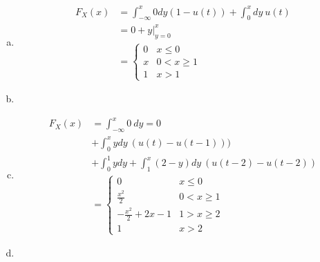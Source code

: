 \documentclass[12pt]{article}
\newenvironment{problem}[2][Problem]{\begin{trivlist}
\item[\hskip \labelsep {\bfseries #1}\hskip \labelsep {\bfseries #2.}]
  \vspace{1 cm}
}{\end{trivlist}}
\begin{document}
\begin{problem}{3.11} %
\item
  \begin{enumerate}[a.]
    \item %
      \begin{align*}
        F_X(x) &= \int_{-\infty}^{x} 0dy(1-u(t)) + \int_{0}^{x} dy  \ u(t) \\
        &= 0 + y\big|_{y=0}^x \\
        &=\begin{cases}
            0 & x \leq 0 \\
            x & 0 < x \geq 1 \\
            1 & x > 1
          \end{cases}
      \end{align*}
    \item %
    \item %
      \begin{align*}
        F_X(x) &= \int_{-\infty}^{x} 0 \ dy = 0 \\
          &+ \int_{0}^{x} y  dy \ (u(t)-u(t-1))) \\
          &+ \int_0^1 y  dy + \int_1^x (2-y)dy \ (u(t-2) - u(t-2)) \\
        &=\begin{cases}
            0 & x \leq 0 \\
            \frac{x^2}{2} & 0 < x \geq 1 \\
            -\frac{x^2}{2} + 2x - 1 & 1 > x \geq 2 \\
            1 & x > 2
          \end{cases}
      \end{align*}
    \item %
  \end{enumerate}
\end{problem}
\end{document}
